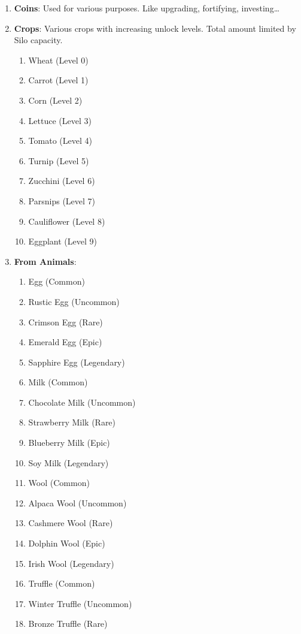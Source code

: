 \documentclass[12pt]{article}
\begin{document}
\begin{enumerate}
    \item \textbf{Coins}: Used for various purposes. Like upgrading, fortifying, investing…
    \item \textbf{Crops}: Various crops with increasing unlock levels. Total amount limited by Silo capacity.
    \begin{enumerate}
        \item Wheat (Level 0)
        \item Carrot (Level 1)
        \item Corn (Level 2)
        \item Lettuce (Level 3)
        \item Tomato (Level 4)
        \item Turnip (Level 5)
        \item Zucchini (Level 6)
        \item Parsnips (Level 7)
        \item Cauliflower (Level 8)
        \item Eggplant (Level 9)
    \end{enumerate}
    \item \textbf{From Animals}:
    \begin{enumerate}
        \item Egg (Common)
        \item Rustic Egg (Uncommon)
        \item Crimson Egg (Rare)
        \item Emerald Egg (Epic)
        \item Sapphire Egg (Legendary)
        \item Milk (Common)
        \item Chocolate Milk (Uncommon)
        \item Strawberry Milk (Rare)
        \item Blueberry Milk (Epic)
        \item Soy Milk (Legendary)
        \item Wool (Common)
        \item Alpaca Wool (Uncommon)
        \item Cashmere Wool (Rare)
        \item Dolphin Wool (Epic)
        \item Irish Wool (Legendary)
        \item Truffle (Common)
        \item Winter Truffle (Uncommon)
        \item Bronze Truffle (Rare)

\end{enumerate}
\end{enumerate}
\end{document}
